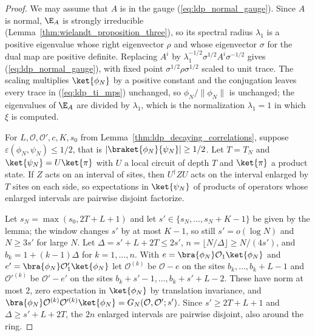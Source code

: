\begin{proof}
    \leanok
    We may assume that $A$ is in the gauge (\ref{eq:ldp_normal_gauge}). Since
    $A$ is normal, $\E_A$ is strongly irreducible
    (Lemma~\ref{thm:wielandt_proposition_three}), so its spectral radius
    $\lambda_1$ is a positive eigenvalue whose right eigenvector $\rho$ and
    whose eigenvector $\sigma$ for the dual map are positive definite. Replacing
    $A^i$ by $\lambda_1^{-1/2}\sigma^{1/2}A^i\sigma^{-1/2}$ gives
    (\ref{eq:ldp_normal_gauge}), with fixed point $\sigma^{1/2}\rho\sigma^{1/2}$
    scaled to unit trace. The scaling multiplies
    $\ket{\phi_N}$ by a positive constant and the conjugation leaves every trace
    in (\ref{eq:ldp_ti_mps}) unchanged, so $\phi_N/\lVert\phi_N\rVert$ is
    unchanged; the eigenvalues of $\E_A$ are divided by $\lambda_1$, which is
    the normalization $\lambda_1=1$ in which $\xi$ is computed.

    For $L,\mathcal O,\mathcal O',c,K,s_0$ from
    Lemma~\ref{thm:ldp_decaying_correlations}, suppose
    $\varepsilon(\phi_N,\psi_N)\le1/2$, that is
    $\lvert\braket{\phi_N}{\psi_N}\rvert\ge1/2$. Let $T=T_N$ and
    $\ket{\psi_N}=U\ket{\pi}$ with $U$ a local circuit of depth $T$ and
    $\ket{\pi}$ a product state. If $Z$ acts on an interval of sites, then
    $U^\dagger ZU$ acts on the interval enlarged by $T$ sites on each side, so
    expectations in $\ket{\psi_N}$ of products of operators whose enlarged
    intervals are pairwise disjoint factorize.

    Let $s_N=\max(s_0,2T+L+1)$ and let $s'\in\{s_N,\dots,s_N+K-1\}$ be given
    by the lemma; the window changes $s'$ by at most $K-1$, so still
    $s'=o(\log N)$ and $N\ge3s'$ for large $N$. Let $\Delta=s'+L+2T\le2s'$,
    $n=\lfloor N/\Delta\rfloor\ge N/(4s')$, and $b_k=1+(k-1)\Delta$ for
    $k=1,\dots,n$. With $e=\bra{\phi_N}\mathcal O_1\ket{\phi_N}$ and
    $e'=\bra{\phi_N}\mathcal O'_1\ket{\phi_N}$ let $\mathcal O^{(k)}$ be
    $\mathcal O-e$ on the sites $b_k,\dots,b_k+L-1$ and $\mathcal O'^{(k)}$ be
    $\mathcal O'-e'$ on the sites $b_k+s'-1,\dots,b_k+s'+L-2$. These have norm at
    most $2$, zero expectation in $\ket{\phi_N}$ by translation invariance,
    and $\bra{\phi_N}\mathcal O^{(k)}\mathcal O'^{(k)}\ket{\phi_N}
        =G_N(\mathcal O,\mathcal O';s')$. Since $s'\ge2T+L+1$ and
    $\Delta\ge s'+L+2T$, the $2n$ enlarged intervals are pairwise disjoint,
    also around the ring.


\end{proof}
